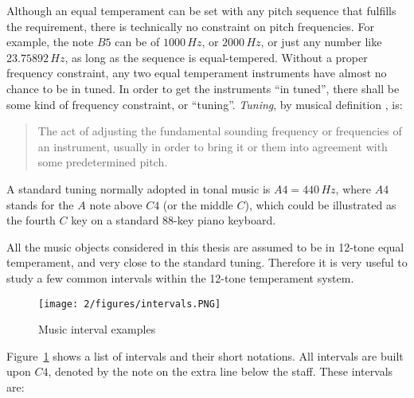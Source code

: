 Although an equal temperament can be set with any pitch sequence that fulfills the requirement, there is technically no constraint on pitch frequencies. For example, the note $B5$ can be of $1000\,Hz$, or $2000\,Hz$, or just any number like $23.75892\,Hz$, as long as the sequence is equal-tempered. Without a proper frequency constraint, any two equal temperament instruments have almost no chance to be in tuned. In order to get the instruments ``in tuned'', there shall be some kind of frequency constraint, or ``tuning''. {\it Tuning}, by musical definition \cite{randel1999harvard}, is:
\begin{quote}
The act of adjusting the fundamental sounding frequency or frequencies of an instrument, usually in order to bring it or them into agreement with some predetermined pitch.
\end{quote}
A standard tuning normally adopted in tonal music is $A4 = 440\,Hz$, where $A4$ stands for the $A$ note above $C4$ (or the middle $C$), which could be illustrated as the fourth $C$ key on a standard 88-key piano keyboard.

All the music objects considered in this thesis are assumed to be in 12-tone equal temperament, and very close to the standard tuning. Therefore it is very useful to study a few common intervals within the 12-tone temperament system.

\begin{figure}[htb]
\centering
\texttt{[image: 2/figures/intervals.PNG]}
\caption{Music interval examples}
\label{fig:2-mi}
\end{figure}

\noindent
Figure~\ref{fig:2-mi} shows a list of intervals and their short notations. All intervals are built upon $C4$, denoted by the note on the extra line below the staff. These intervals are:

